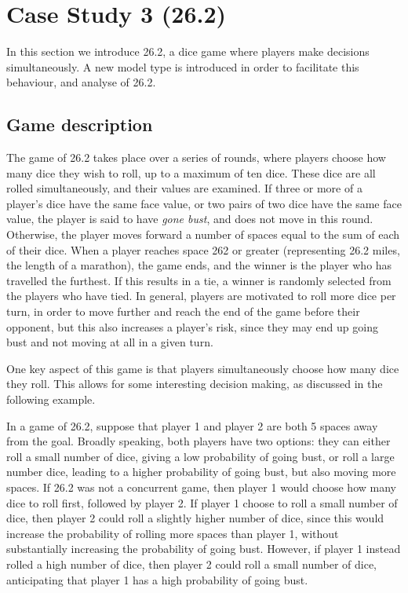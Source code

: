 \chapter{Case Study 3 (26.2)}
\label{ch:cs3}

In this section we introduce 26.2, a dice game where players make decisions simultaneously. A new model type is introduced in order to facilitate this behaviour, and analyse of 26.2. %

\section{Game description}

The game of 26.2 takes place over a series of rounds, where players choose how many dice they wish to roll, up to a maximum of ten dice. These dice are all rolled simultaneously, and their values are examined. If three or more of a player's dice have the same face value, or two pairs of two dice have the same face value, the player is said to have \emph{gone bust}, and does not move in this round. Otherwise, the player moves forward a number of spaces equal to the sum of each of their dice. When a player reaches space 262 or greater (representing 26.2 miles, the length of a marathon), the game ends, and the winner is the player who has travelled the furthest. If this results in a tie, a winner is randomly selected from the players who have tied. In general, players are motivated to roll more dice per turn, in order to move further and reach the end of the game before their opponent, but this also increases a player's risk, since they may end up going bust and not moving at all in a given turn.

One key aspect of this game is that players simultaneously choose how many dice they roll. This allows for some interesting decision making, as discussed in the following example.

\begin{example}
\label{cs3:example_concurrency}

In a game of 26.2, suppose that player 1 and player 2 are both 5 spaces away from the goal. Broadly speaking, both players have two options: they can either roll a small number of dice, giving a low probability of going bust, or roll a large number dice, leading to a higher probability of going bust, but also moving more spaces. If 26.2 was not a concurrent game, then player 1 would choose how many dice to roll first, followed by player 2. If player 1 choose to roll a small number of dice, then player 2 could roll a slightly higher number of dice, since this would increase the probability of rolling more spaces than player 1, without substantially increasing the probability of going bust. However, if player 1 instead rolled a high number of dice, then player 2 could roll a small number of dice, anticipating that player 1 has a high probability of going bust.
%
\end{example}

